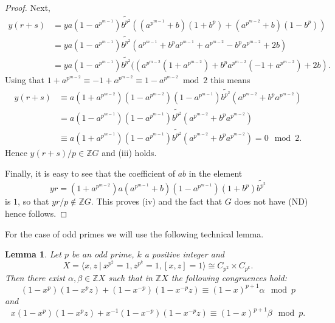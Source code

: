 \documentclass[a4paper,10pt]{amsart}
\newtheorem{lemma}{Lemma}[section]
\theoremstyle{definition}
\theoremstyle{remark}
\begin{document}
\begin{proof}
Next,
\begin{align*}
y(r+s) &= ya(1-a^{p^{m-1}})\widetilde{b^{p^2}}((a^{p^{m-1}} + b)(1+b^p) + (a^{p^{m-2}} + b)(1-b^p)) \\
&= ya(1-a^{p^{m-1}})\widetilde{b^{p^2}}(a^{p^{m-1}} + b^pa^{p^{m-1}} + a^{p^{m-2}} - b^pa^{p^{m-2}} + 2b) \\
&= ya(1-a^{p^{m-1}})\widetilde{b^{p^2}}((a^{p^{m-2}}(1 + a^{p^{m-2}}) + b^pa^{p^{m-2}}(-1 + a^{p^{m-2}}) + 2b).
\end{align*}
Using that $1 + a^{p^{m-2}} \equiv -1 + a^{p^{m-2}} \equiv 1 - a^{p^{m-2}} \bmod 2$ this means
\begin{align*}
y(r+s) &\equiv a(1+a^{p^{m-2}})(1-a^{p^{m-2}})(1-a^{p^{m-1}})\widetilde{b^{p^2}}(a^{p^{m-2}} + b^pa^{p^{m-2}}) \\
&= a(1 - a^{p^{m-1}})(1-a^{p^{m-1}})\widetilde{b^{p^2}}(a^{p^{m-2}} + b^pa^{p^{m-2}}) \\
&\equiv a(1 + a^{p^{m-1}})(1-a^{p^{m-1}})\widetilde{b^{p^2}}(a^{p^{m-2}} + b^pa^{p^{m-2}}) = 0 \mod 2.
\end{align*}
Hence $y(r+s)/p \in \mathbb{Z}G$ and (iii) holds.

Finally, it is easy to see that the coefficient of $ab$ in the element 
\[yr = (1+a^{p^{m-2}})a(a^{p^{m-1}} + b)(1-a^{p^{m-1}})(1+b^p)\widetilde{b^{p^2}}\]
is $1$, so that $yr/p \notin \mathbb{Z}G$. This proves (iv) and the fact that $G$ does not have (ND) hence follows.
\end{proof}

For the case of odd primes we will use the following technical lemma.

\begin{lemma}\label{lem:GpmnTechnicalLemmaOddp}
Let $p$ be an odd prime, $k$ a positive integer and 
\[X =  \langle x,z \ | \ x^{p^2} = 1, z^{p^k} = 1, [x,z] = 1 \rangle \cong C_{p^2} \times C_{p^k}. \]
 Then there exist $\alpha, \beta \in \mathbb{Z}X$ such that in $\mathbb{Z}X$ the following congruences hold:
\[(1-x^p)(1-x^pz) + (1-x^{-p})(1-x^{-p}z) \equiv (1-x)^{p+1}\alpha  \mod p\]
and 
\[x(1-x^p)(1-x^pz) + x^{-1}(1-x^{-p})(1-x^{-p}z) \equiv (1-x)^{p+1}\beta  \mod p.\]
\end{lemma}
\end{document}
